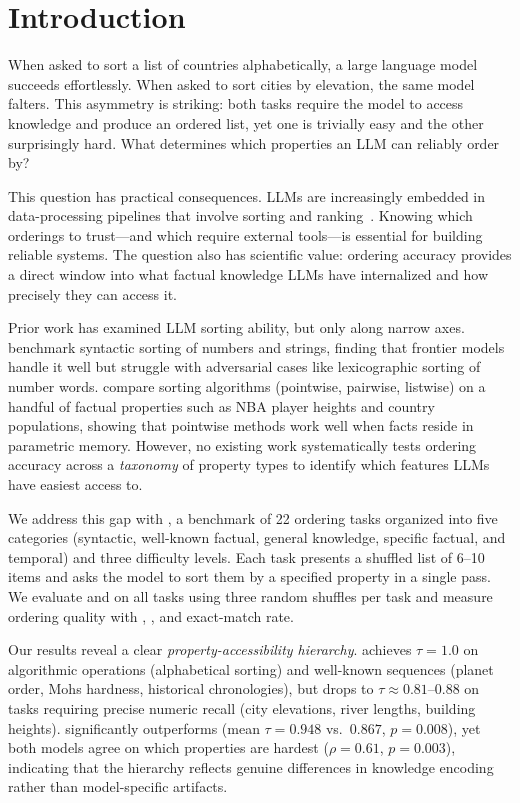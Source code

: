 \section{Introduction}
\label{sec:intro}

When asked to sort a list of countries alphabetically, a large language model succeeds effortlessly.
When asked to sort cities by elevation, the same model falters.
This asymmetry is striking: both tasks require the model to access knowledge and produce an ordered list, yet one is trivially easy and the other surprisingly hard.
What determines which properties an LLM can reliably order by?

This question has practical consequences.
LLMs are increasingly embedded in data-processing pipelines that involve sorting and ranking~\cite{patel2025semantic,zhao2025access}.
Knowing which orderings to trust---and which require external tools---is essential for building reliable systems.
The question also has scientific value: ordering accuracy provides a direct window into what factual knowledge LLMs have internalized and how precisely they can access it.

Prior work has examined LLM sorting ability, but only along narrow axes.
\citet{herbold2025sortbench} benchmark syntactic sorting of numbers and strings, finding that frontier models handle it well but struggle with adversarial cases like lexicographic sorting of number words.
\citet{zhao2025access} compare sorting algorithms (pointwise, pairwise, listwise) on a handful of factual properties such as NBA player heights and country populations, showing that pointwise methods work well when facts reside in parametric memory.
However, no existing work systematically tests ordering accuracy across a \emph{taxonomy} of property types to identify which features LLMs have easiest access to.

We address this gap with \benchname, a benchmark of 22 ordering tasks organized into five categories (syntactic, well-known factual, general knowledge, specific factual, and temporal) and three difficulty levels.
Each task presents a shuffled list of 6--10 items and asks the model to sort them by a specified property in a single pass.
We evaluate \gptlarge and \gptsmall on all tasks using three random shuffles per task and measure ordering quality with \kendalltau, \spearmanrho, and exact-match rate.

Our results reveal a clear \emph{property-accessibility hierarchy}.
\gptlarge achieves $\tau = 1.0$ on algorithmic operations (alphabetical sorting) and well-known sequences (planet order, Mohs hardness, historical chronologies), but drops to $\tau \approx 0.81$--$0.88$ on tasks requiring precise numeric recall (city elevations, river lengths, building heights).
\gptlarge significantly outperforms \gptsmall (mean $\tau = 0.948$ vs.\ $0.867$, $p = 0.008$), yet both models agree on which properties are hardest ($\rho = 0.61$, $p = 0.003$), indicating that the hierarchy reflects genuine differences in knowledge encoding rather than model-specific artifacts.

